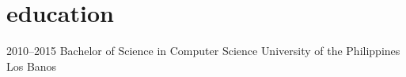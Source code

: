 \documentclass[print]{cv-style}          %
\begin{document}

\section{education}

\begin{entrylist}
\entry
{2010--2015}
{Bachelor of Science {\normalfont in Computer Science}}
{University of the Philippines Los Banos}
{\vspace{-0.3cm}}
\end{entrylist}






\end{document}
